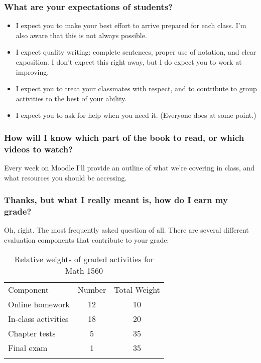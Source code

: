 \documentclass[10pt,]{article}
\newcommand{\hrulethin}  {\noalign{\hrule height 0.04em}}
\begin{document}
\subsubsection[{What are your expectations of students?}]{What are your expectations of students?}\label{subsubsection-10}
\leavevmode%
\begin{itemize}[label=\textbullet]
\item{}I expect you to make your best effort to arrive prepared for each class. I'm also aware that this is not always possible.%
\item{}I expect quality writing: complete sentences, proper use of notation, and clear exposition. I don't expect this right away, but I do expect you to work at improving.%
\item{}I expect you to treat your classmates with respect, and to contribute to group activities to the best of your ability.%
\item{}I expect you to ask for help when you need it. (Everyone does at some point.)%
\end{itemize}
%
%
\typeout{************************************************}
\typeout{************************************************}
%
\subsubsection[{How will I know which part of the book to read, or which videos to watch?}]{How will I know which part of the book to read, or which videos to watch?}\label{subsubsection-11}
\hypertarget{p-18}{}%
Every week on Moodle I'll provide an outline of what we're covering in class, and what resources you should be accessing.%
%
%
\typeout{************************************************}
\typeout{************************************************}
%
\subsubsection[{Thanks, but what I really meant is, how do I earn my grade?}]{Thanks, but what I really meant is, how do I earn my grade?}\label{subsubsection-12}
\hypertarget{p-19}{}%
Oh, right. The most frequently asked question of all. There are several different evaluation components that contribute to your grade:%
\begin{table}
\centering
\begin{tabular}{lcc}\hrulethin
Component&Number&Total Weight\tabularnewline\hrulethin
Online homework&12&10\tabularnewline[0pt]
In-class activities&18&20\tabularnewline[0pt]
Chapter tests&5&35\tabularnewline[0pt]
Final exam&1&35\tabularnewline\hrulethin
\end{tabular}
\caption{Relative weights of graded activities for Math 1560\label{table-evaluation}}
\end{table}
%
%
\typeout{************************************************}
\typeout{************************************************}
%
\end{document}
